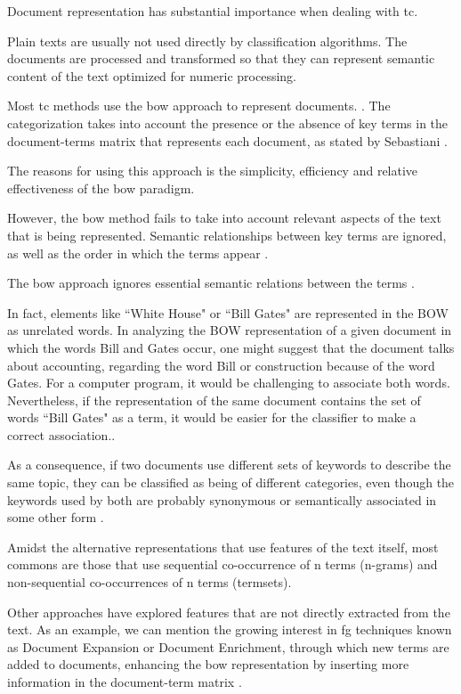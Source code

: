 Document representation has substantial importance when dealing with \gls{tc}.

Plain texts are usually not used directly by classification algorithms.  The documents are processed and transformed so that they can represent semantic content of the text optimized for numeric processing.   

Most \gls{tc} methods use the \gls{bow} approach to represent documents. \cite{Lan:2009} \cite{Manning:2008}. The categorization takes into account the presence or the absence of key terms in the document-terms matrix that represents each document, as stated by Sebastiani \cite{Sebastiani:2002}.

The reasons for using this approach is the simplicity, efficiency and relative effectiveness of the \gls{bow} paradigm.

However, the \gls{bow} method fails to take into account relevant aspects of the text that is being represented. Semantic relationships between key terms are ignored, as well as the order in which the terms appear \cite{Gabrilovich:2005, Lan:2009}.

The \gls{bow} approach ignores essential semantic relations between the terms \cite {Hu:2008}.

In fact, elements like ``White House" or ``Bill Gates" are represented in the BOW as unrelated words. In analyzing the BOW representation of a given document in which the words Bill and Gates occur, one might suggest that the document talks about accounting, regarding the word Bill or construction because of the word Gates. For a computer program, it would be challenging to associate both words.
Nevertheless, if the representation of the same document contains the set of words ``Bill Gates" as a term, it would be easier for the classifier to make a correct association.\cite{bekkerman2004using}.


As a consequence, if two documents use different sets of keywords to describe the same topic, they can be classified as being of different categories, even though the keywords used by both are probably synonymous or semantically associated in some other form \cite {Hu:2009}.

Amidst the alternative representations that use features of the text itself, most commons are those that use sequential co-occurrence of n terms (n-grams) and non-sequential co-occurrences of n terms (termsets). 

Other approaches have explored features that are not directly extracted from the text. As an example, we can mention the growing interest in \gls{fg} techniques known as Document Expansion or Document Enrichment, through which new terms are added to documents, enhancing the \gls{bow} representation by inserting more information in the document-term matrix \cite {Gabrilovich:2005}.

